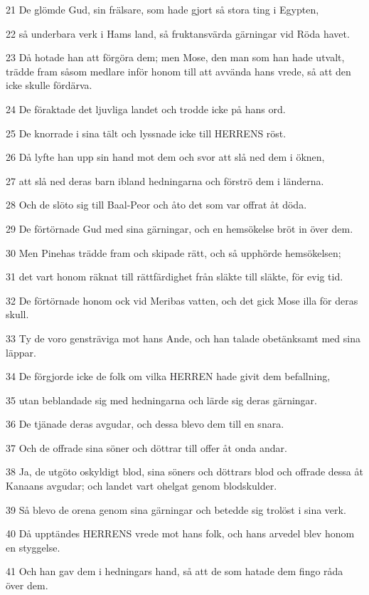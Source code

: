 \par 21 De glömde Gud, sin frälsare, som hade gjort så stora ting i Egypten,
\par 22 så underbara verk i Hams land, så fruktansvärda gärningar vid Röda havet.
\par 23 Då hotade han att förgöra dem; men Mose, den man som han hade utvalt, trädde fram såsom medlare inför honom till att avvända hans vrede, så att den icke skulle fördärva.
\par 24 De föraktade det ljuvliga landet och trodde icke på hans ord.
\par 25 De knorrade i sina tält och lyssnade icke till HERRENS röst.
\par 26 Då lyfte han upp sin hand mot dem och svor att slå ned dem i öknen,
\par 27 att slå ned deras barn ibland hedningarna och förströ dem i länderna.
\par 28 Och de slöto sig till Baal-Peor och åto det som var offrat åt döda.
\par 29 De förtörnade Gud med sina gärningar, och en hemsökelse bröt in över dem.
\par 30 Men Pinehas trädde fram och skipade rätt, och så upphörde hemsökelsen;
\par 31 det vart honom räknat till rättfärdighet från släkte till släkte, för evig tid.
\par 32 De förtörnade honom ock vid Meribas vatten, och det gick Mose illa för deras skull.
\par 33 Ty de voro gensträviga mot hans Ande, och han talade obetänksamt med sina läppar.
\par 34 De förgjorde icke de folk om vilka HERREN hade givit dem befallning,
\par 35 utan beblandade sig med hedningarna och lärde sig deras gärningar.
\par 36 De tjänade deras avgudar, och dessa blevo dem till en snara.
\par 37 Och de offrade sina söner och döttrar till offer åt onda andar.
\par 38 Ja, de utgöto oskyldigt blod, sina söners och döttrars blod och offrade dessa åt Kanaans avgudar; och landet vart ohelgat genom blodskulder.
\par 39 Så blevo de orena genom sina gärningar och betedde sig trolöst i sina verk.
\par 40 Då upptändes HERRENS vrede mot hans folk, och hans arvedel blev honom en styggelse.
\par 41 Och han gav dem i hedningars hand, så att de som hatade dem fingo råda över dem.
